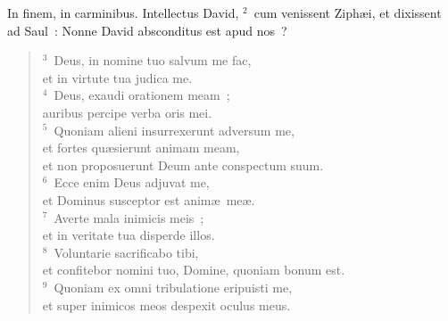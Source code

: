 \bchapter
\lettrine[lines=3,image=true,loversize=0.05,lraise=-0.03]{I}{}n finem, in carminibus. Intellectus David,
${}^{2}$~cum venissent Ziph\ae i, et dixissent ad Saul~: Nonne David absconditus est apud nos~?
\begin{flushleft}\begin{verse}${}^{3}$~Deus, in nomine tuo salvum me fac,\\ et in virtute tua judica me.\\
${}^{4}$~Deus, exaudi orationem meam~;\\ auribus percipe verba oris mei.\\
${}^{5}$~Quoniam alieni insurrexerunt adversum me,\\ et fortes qu\ae sierunt animam meam,\\ et non proposuerunt Deum ante conspectum suum.\\
${}^{6}$~Ecce enim Deus adjuvat me,\\ et Dominus susceptor est anim\ae\ me\ae .\\
${}^{7}$~Averte mala inimicis meis~;\\ et in veritate tua disperde illos.\\
${}^{8}$~Voluntarie sacrificabo tibi,\\ et confitebor nomini tuo, Domine, quoniam bonum est.\\
${}^{9}$~Quoniam ex omni tribulatione eripuisti me,\\ et super inimicos meos despexit oculus meus.\end{verse}\end{flushleft}



